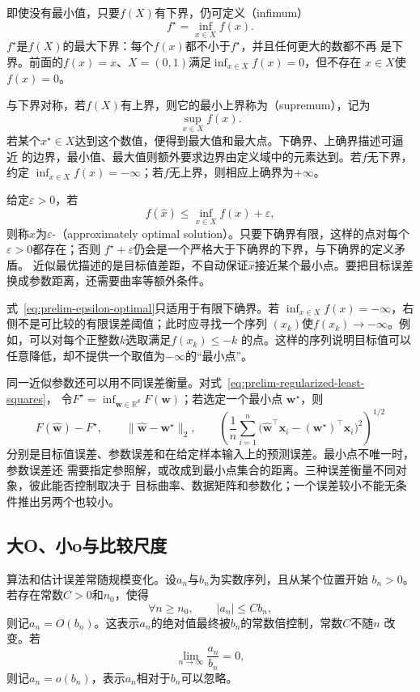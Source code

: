 即使没有最小值，只要$f(X)$有下界，仍可定义（infimum）
\[
  f^\star=\inf_{x\in X}f(x).
\]
$f^\star$是$f(X)$的最大下界：每个$f(x)$都不小于$f^\star$，并且任何更大的数都不再
是下界。前面的$f(x)=x$、$X=(0,1)$满足$\inf_{x\in X}f(x)=0$，但不存在
$x\in X$使$f(x)=0$。

与下界对称，若$f(X)$有上界，则它的最小上界称为（supremum），记为
\[
  \sup_{x\in X}f(x).
\]
若某个$x^\star\in X$达到这个数值，便得到最大值和最大点。下确界、上确界描述可逼近
的边界，最小值、最大值则额外要求边界由定义域中的元素达到。若$f$无下界，约定
$\inf_{x\in X}f(x)=-\infty$；若$f$无上界，则相应上确界为$+\infty$。

给定$\varepsilon>0$，若
\begin{equation}
  f(\widehat{x})\leq \inf_{x\in X}f(x)+\varepsilon,
  \label{eq:prelim-epsilon-optimal}
\end{equation}
则称$\widehat{x}$为$\varepsilon$-（approximately optimal
solution）。只要下确界有限，这样的点对每个$\varepsilon>0$都存在；否则
$f^\star+\varepsilon$仍会是一个严格大于下确界的下界，与下确界的定义矛盾。
近似最优描述的是目标值差距，不自动保证$\widehat{x}$接近某个最小点。要把目标误差
换成参数距离，还需要曲率等额外条件。

式~\eqref{eq:prelim-epsilon-optimal}只适用于有限下确界。若
$\inf_{x\in X}f(x)=-\infty$，右侧不是可比较的有限误差阈值；此时应寻找一个序列
$(x_k)$使$f(x_k)\to-\infty$。例如，可以对每个正整数$k$选取满足$f(x_k)\leq-k$
的点。这样的序列说明目标值可以任意降低，却不提供一个取值为$-\infty$的“最小点”。

同一近似参数还可以用不同误差衡量。对式~\eqref{eq:prelim-regularized-least-squares}，
令$F^\star=\inf_{\bm{w}\in\mathbb{R}^d}F(\bm{w})$；若选定一个最小点
$\bm{w}^\star$，则
\[
  F(\widehat{\bm{w}})-F^\star,\qquad
  \lVert\widehat{\bm{w}}-\bm{w}^\star\rVert_2,\qquad
  \left(
    \frac{1}{n}\sum_{i=1}^{n}
    \bigl(
      \widehat{\bm{w}}^{\top}\bm{x}_i
      -(\bm{w}^\star)^{\top}\bm{x}_i
    \bigr)^2
  \right)^{1/2}
\]
分别是目标值误差、参数误差和在给定样本输入上的预测误差。最小点不唯一时，参数误差还
需要指定参照解，或改成到最小点集合的距离。三种误差衡量不同对象，彼此能否控制取决于
目标曲率、数据矩阵和参数化；一个误差较小不能无条件推出另两个也较小。

\subsection{大O、小o与比较尺度}

算法和估计误差常随规模变化。设$a_n$与$b_n$为实数序列，且从某个位置开始
$b_n>0$。若存在常数$C>0$和$n_0$，使得
\[
  \forall n\geq n_0,\qquad |a_n|\leq Cb_n,
\]
则记$a_n=O(b_n)$。这表示$a_n$的绝对值最终被$b_n$的常数倍控制，常数$C$不随$n$
改变。若
\[
  \lim_{n\to\infty}\frac{a_n}{b_n}=0,
\]
则记$a_n=o(b_n)$，表示$a_n$相对于$b_n$可以忽略。

